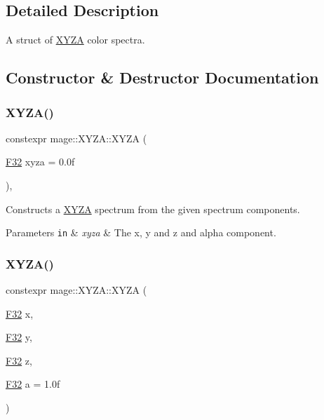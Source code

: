 \subsection{Detailed Description}
A struct of \hyperlink{structmage_1_1_x_y_z_a}{X\+Y\+ZA} color spectra. 

\subsection{Constructor \& Destructor Documentation}
\hypertarget{structmage_1_1_x_y_z_a_ab954075ab032465c9199870646a2718b}{}\label{structmage_1_1_x_y_z_a_ab954075ab032465c9199870646a2718b} 
\subsubsection{\texorpdfstring{X\+Y\+Z\+A()}{XYZA()}\hspace{0.1cm}{\footnotesize\ttfamily [1/7]}}
{\footnotesize\ttfamily constexpr mage\+::\+X\+Y\+Z\+A\+::\+X\+Y\+ZA (\begin{DoxyParamCaption}\item[{\hyperlink{namespacemage_aa97e833b45f06d60a0a9c4fc22ae02c0}{F32}}]{xyza = {\ttfamily 0.0f} }\end{DoxyParamCaption})\hspace{0.3cm}{\ttfamily [explicit]}, {\ttfamily [noexcept]}}

Constructs a \hyperlink{structmage_1_1_x_y_z_a}{X\+Y\+ZA} spectrum from the given spectrum components.


\begin{DoxyParams}[1]{Parameters}
\mbox{\tt in}  & {\em xyza} & The x, y and z and alpha component. \\
\hline
\end{DoxyParams}
\hypertarget{structmage_1_1_x_y_z_a_abe082fe71a6b7f7a855b65f5491e24d6}{}\label{structmage_1_1_x_y_z_a_abe082fe71a6b7f7a855b65f5491e24d6} 
\subsubsection{\texorpdfstring{X\+Y\+Z\+A()}{XYZA()}\hspace{0.1cm}{\footnotesize\ttfamily [2/7]}}
{\footnotesize\ttfamily constexpr mage\+::\+X\+Y\+Z\+A\+::\+X\+Y\+ZA (\begin{DoxyParamCaption}\item[{\hyperlink{namespacemage_aa97e833b45f06d60a0a9c4fc22ae02c0}{F32}}]{x,  }\item[{\hyperlink{namespacemage_aa97e833b45f06d60a0a9c4fc22ae02c0}{F32}}]{y,  }\item[{\hyperlink{namespacemage_aa97e833b45f06d60a0a9c4fc22ae02c0}{F32}}]{z,  }\item[{\hyperlink{namespacemage_aa97e833b45f06d60a0a9c4fc22ae02c0}{F32}}]{a = {\ttfamily 1.0f} }\end{DoxyParamCaption})\hspace{0.3cm}{\ttfamily [noexcept]}}

